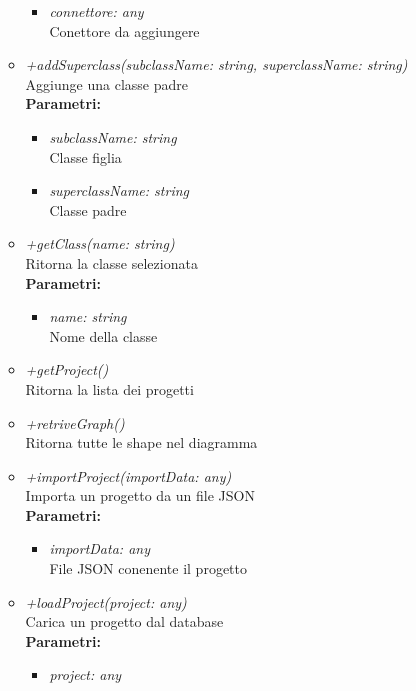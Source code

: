 \begin{itemize}
\begin{itemize}
    		\begin{itemize}
    			\item \emph{connettore: any}\\
    			Conettore da aggiungere
    		\end{itemize}
    		\item \emph{+addSuperclass(subclassName: string, superclassName: string)}\\
    		Aggiunge una classe padre\\
    		\textbf{Parametri:}
    		\begin{itemize}
    			\item \emph{subclassName: string}\\
    			Classe figlia
    			\item \emph{superclassName: string}\\
    			Classe padre
    		\end{itemize}
    		\item \emph{+getClass(name: string)}\\
    		Ritorna la classe selezionata\\
    		\textbf{Parametri:}
    		\begin{itemize}
    			\item \emph{name: string}\\
    			Nome della classe
    		\end{itemize}
    		\item \emph{+getProject()}\\
    		Ritorna la lista dei progetti
    		\item \emph{+retriveGraph()}\\
    		Ritorna tutte le shape nel diagramma
    		\item \emph{+importProject(importData: any)}\\
    		Importa un progetto da un file JSON\\
    		\textbf{Parametri:}
    		\begin{itemize}
    			\item \emph{importData: any}\\
    			File JSON conenente il progetto
    		\end{itemize}
    		\item \emph{+loadProject(project: any)}\\
    		Carica un progetto dal database\\
    		\textbf{Parametri:}
    		\begin{itemize}
    			\item \emph{project: any}\\

\end{itemize}
\end{itemize}
\end{itemize}

